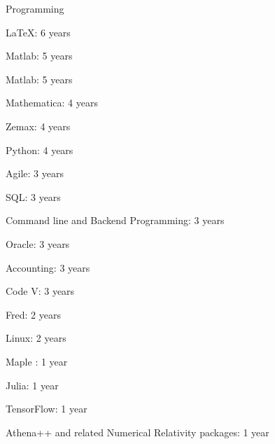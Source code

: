 \begin{cventries}
  \cventry
    {}
    {Programming}
    {}
    {}
    {
      \begin{cvitems}
        \item {LaTeX: 6 years}
        \item {Matlab: 5 years }
        \item {Matlab: 5 years }
        \item {Mathematica: 4 years }
        \item {Zemax: 4 years}
        \item {Python: 4 years }
        \item {Agile: 3 years}
        \item {SQL: 3 years }
        \item{Command line and Backend Programming: 3 years}
        \item {Oracle: 3 years}
        \item{Accounting: 3 years}
        \item {Code V: 3 years}
        \item {Fred: 2 years}
        \item {Linux: 2 years}
        \item {Maple : 1 year}
        \item{Julia: 1 year}
        \item{TensorFlow: 1 year}
        \item{Athena++ and related Numerical Relativity packages: 1 year}
      \end{cvitems}
    }


\end{cventries}
